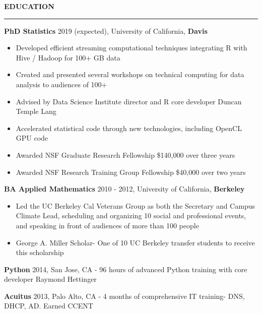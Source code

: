 \documentclass{article}
\begin{document}
\textbf{EDUCATION}
\vspace{0.2 cm}
\hrule
\vspace{0.1 cm}

\begin{description}

    \item \textbf{PhD Statistics}
    \hspace{.5cm}
        2019 (expected), University of California, \textbf{Davis}

\begin{itemize} 
    \item Developed efficient streaming computational techniques
        integrating R with Hive / Hadoop for 100+ GB data
    \item Created and presented several workshops on technical computing
        for data analysis to audiences of 100+
    \item Advised by Data Science Institute director and R core developer Duncan Temple Lang
    \item Accelerated statistical code through new technologies, including
        OpenCL GPU code
    \item Awarded NSF Graduate Research Fellowship \$140,000 over three years
    \item Awarded NSF Research Training Group Fellowship \$40,000 over two years
\end{itemize} 

\item \textbf{BA Applied Mathematics}
\hspace{.5cm}
2010 - 2012, University of California, \textbf{Berkeley}

\begin{itemize} 

\item Led the UC Berkeley Cal Veterans Group as both the Secretary and
    Campus Climate Lead, scheduling and organizing 10 social and
        professional events, and speaking in front of audiences of more
        than 100 people 

\item George A. Miller Scholar- One of 10 UC Berkeley transfer students to receive this scholarship

\end{itemize}

\item\textbf{Python}  \hspace{.5cm} 2014, San Jose, CA - 96 hours of advanced Python training with core
    developer Raymond Hettinger

\item\textbf{Acuitus}  \hspace{.5cm} 2013, Palo Alto, CA - 4 months of comprehensive IT training- DNS, DHCP, AD. Earned CCENT

\end{description}
\end{document}
